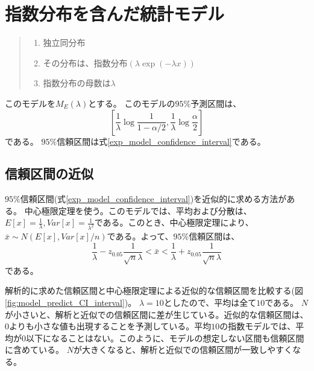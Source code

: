 \section{指数分布を含んだ統計モデル}
\begin{quote}
    \begin{enumerate}[(1)]
    \item 独立同分布
    \item その分布は、指数分布$(\lambda\exp{(-\lambda x)})$
    \item 指数分布の母数は$\lambda$
    \end{enumerate}
\end{quote}
このモデルを$M_E(\lambda)$とする。
このモデルの$95\%$予測区間は、
\begin{equation*}
 \left[ \frac{1}{\lambda} \log\frac{1}{1-\alpha/2} ,\frac{1}{\lambda}\log\frac{\alpha}{2} \right]
\end{equation*}
である。
$95\%$信頼区間は式\ref{exp_model_confidence_interval}である。


\subsection{信頼区間の近似}
$95\%$信頼区間(式\ref{exp_model_confidence_interval})を近似的に求める方法がある。
中心極限定理を使う。このモデルでは、平均および分散は、$E[x]=\frac{1}{\lambda},Var[x]=\frac{1}{\lambda^2}$である。このとき、中心極限定理により、$\bar{x}\sim N(E[x],Var[x]/n)$である。よって、$95\%$信頼区間は、
\begin{equation*}
\frac{1}{\lambda}-z_{0.05}\frac{1}{\sqrt{n}\lambda}<\bar{x}<\frac{1}{\lambda}+z_{0.05}\frac{1}{\sqrt{n}\lambda}
\end{equation*}
である。

解析的に求めた信頼区間と中心極限定理による近似的な信頼区間を比較する(図\ref{fig:model_predict_CI_interval})。
$\lambda=10$としたので、平均は全て$10$である。
$N$が小さいと、解析と近似での信頼区間に差が生じている。近似的な信頼区間は、$0$よりも小さな値も出現することを予測している。平均$10$の指数モデルでは、平均が$0$以下になることはない。このように、モデルの想定しない区間も信頼区間に含めている。
$N$が大きくなると、解析と近似での信頼区間が一致しやすくなる。

